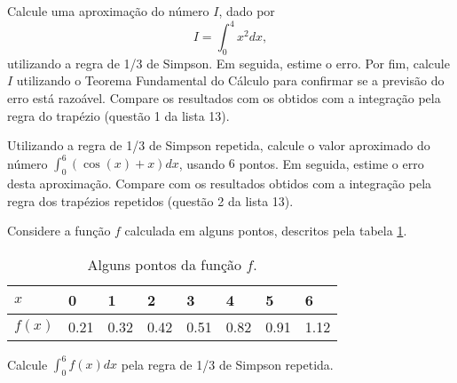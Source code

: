 %
%
%
%
%
%
%
%
%
%
%
%
%
%
%
%
%
%
%
%
%
%
%

\begin{ex}
Calcule uma aproximação do número $I$, dado por $$I=\int_0^4 x^2 dx,$$ utilizando a regra de 1/3 de Simpson. Em seguida, estime o erro. Por fim, calcule $I$ utilizando o Teorema Fundamental do Cálculo para confirmar se a previsão do erro está razoável. Compare os resultados com os obtidos com a integração pela regra do trapézio (questão 1 da lista 13).
\end{ex}

\begin{ex}
Utilizando a regra de 1/3 de Simpson repetida, calcule o valor aproximado do número $\int_0^6 (\cos(x) + x)dx$, usando $6$ pontos. Em seguida, estime o erro desta aproximação. Compare com os resultados obtidos com a integração pela regra dos trapézios repetidos (questão 2 da lista 13).
\end{ex}

\begin{ex}
Considere a função $f$ calculada em alguns pontos, descritos pela tabela \ref{inte}.

\begin{table}[htb]
\centering
\caption{Alguns pontos da função $f$.}
\label{inte}
\begin{tabular}{@{}llllllll@{}}
\toprule
$x$    & 0    & 1    & 2    & 3    & 4    & 5    & 6    \\ \midrule
$f(x)$ & 0.21 & 0.32 & 0.42 & 0.51 & 0.82 & 0.91 & 1.12 \\ \bottomrule
\end{tabular}
\end{table}

Calcule $\int_0^6 f(x)dx$ pela regra de 1/3 de Simpson repetida.
\end{ex}


